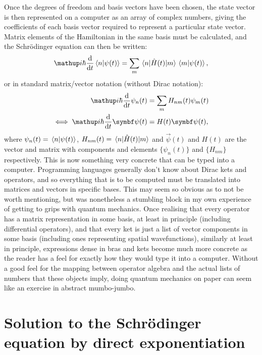 Once the degrees of freedom and basis vectors have been chosen, the state vector is then represented on a computer as an array of complex numbers, giving the coefficients of each basis vector required to represent a particular state vector. Matrix elements of the Hamiltonian in the same basis must be calculated, and the Schr\"odinger equation can then be written:
\begin{align}
\ii\hbar\dv{t}\braket n{\psi(t)} = \sum_m\matrixel n {\hat H(t)} m \braket m {\psi(t)},
\end{align}
or in standard matrix/vector notation (without Dirac notation):
\begin{align}\label{eq:schrodinger_equation_matrix_vector}
\ii\hbar\dv{t}\psi_n(t) &= \sum_m H_{nm}(t) \psi_m(t)\\
\iff \ii\hbar\dv{t} \vec \psi(t) &= H(t) \vec \psi(t),
\end{align}
where $\psi_n(t) = \braket n{\psi(t)}$, $H_{nm}(t) = \matrixel n {\hat H(t)} m$ and $\vec \psi(t)$ and $H(t)$ are the vector and matrix with components and elements $\{\psi_n(t)\}$ and $\{H_{nm}\}$ respectively.
This is now something very concrete that can be typed into a computer. Programming languages generally don't know about Dirac kets and operators, and so everything that is to be computed must be translated into matrices and vectors in specific bases. This may seem so obvious as to not be worth mentioning, but was nonetheless a stumbling block in my own experience of getting to grips with quantum mechanics. Once realising that every operator has a matrix representation in some basis, at least in principle (including differential operators), and that every ket is just a list of vector components in some basis (including ones representing spatial wavefunctions), similarly at least in principle, expressions dense in bras and kets become much more concrete as the reader has a feel for exactly how they would type it into a computer. Without a good feel for the mapping between operator algebra and the actual lists of numbers that these objects imply, doing quantum mechanics on paper can seem like an exercise in abstract mumbo-jumbo.

\section{Solution to the Schr\"odinger equation by direct exponentiation}

